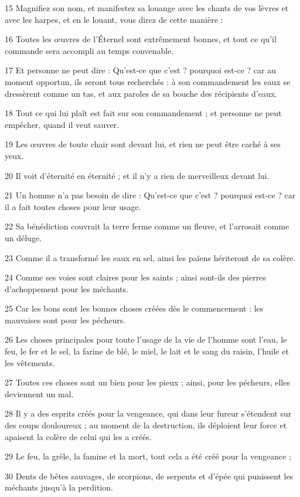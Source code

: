 \par 15 Magnifiez son nom, et manifestez sa louange avec les chants de vos lèvres et avec les harpes, et en le louant, vous direz de cette manière :
\par 16 Toutes les œuvres de l'Éternel sont extrêmement bonnes, et tout ce qu'il commande sera accompli au temps convenable.
\par 17 Et personne ne peut dire : Qu'est-ce que c'est ? pourquoi est-ce ? car au moment opportun, ils seront tous recherchés : à son commandement les eaux se dressèrent comme un tas, et aux paroles de sa bouche des récipients d'eaux.
\par 18 Tout ce qui lui plaît est fait sur son commandement ; et personne ne peut empêcher, quand il veut sauver.
\par 19 Les œuvres de toute chair sont devant lui, et rien ne peut être caché à ses yeux.
\par 20 Il voit d'éternité en éternité ; et il n'y a rien de merveilleux devant lui.
\par 21 Un homme n'a pas besoin de dire : Qu'est-ce que c'est ? pourquoi est-ce ? car il a fait toutes choses pour leur usage.
\par 22 Sa bénédiction couvrait la terre ferme comme un fleuve, et l'arrosait comme un déluge.
\par 23 Comme il a transformé les eaux en sel, ainsi les païens hériteront de sa colère.
\par 24 Comme ses voies sont claires pour les saints ; ainsi sont-ils des pierres d'achoppement pour les méchants.
\par 25 Car les bons sont les bonnes choses créées dès le commencement : les mauvaises sont pour les pécheurs.
\par 26 Les choses principales pour toute l'usage de la vie de l'homme sont l'eau, le feu, le fer et le sel, la farine de blé, le miel, le lait et le sang du raisin, l'huile et les vêtements.
\par 27 Toutes ces choses sont un bien pour les pieux ; ainsi, pour les pécheurs, elles deviennent un mal.
\par 28 Il y a des esprits créés pour la vengeance, qui dans leur fureur s'étendent sur des coups douloureux ; au moment de la destruction, ils déploient leur force et apaisent la colère de celui qui les a créés.
\par 29 Le feu, la grêle, la famine et la mort, tout cela a été créé pour la vengeance ;
\par 30 Dents de bêtes sauvages, de scorpions, de serpents et d'épée qui punissent les méchants jusqu'à la perdition.

